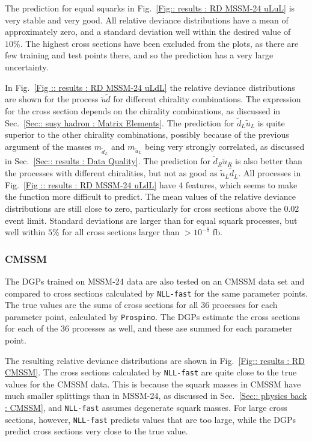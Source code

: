 \documentclass[twoside,english]{uiofysmaster}
\begin{document}
The prediction for equal squarks in Fig.~\ref{Fig:: results : RD MSSM-24 uLuL} is very stable and very good. All relative deviance distributions have a mean of approximately zero, and a standard deviation well within the desired value of $10 \%$. The highest cross sections have been excluded from the plots, as there are few training and test points there, and so the prediction has a very large uncertainty.

In Fig.~\ref{Fig :: results : RD MSSM-24 uLdL} the relative deviance distributions are shown for the process $\tilde{u} \tilde{d}$ for different chirality combinations. The expression for the cross section depends on the chirality combinations, as discussed in Sec.~\ref{Sec:: susy hadron : Matrix Elements}. The prediction for $\tilde{d}_L \tilde{u}_L$ is quite superior to the other chirality combinations, possibly because of the previous argument of the masses $m_{\tilde{d}_L}$ and $m_{\tilde{u}_L}$ being very strongly correlated, as discussed in Sec.~\ref{Sec:: results : Data Quality}. The prediction for $\tilde{d}_R \tilde{u}_R$ is also better than the processes with different chiralities, but not as good as $\tilde{u}_L\tilde{d}_L$. All processes in Fig.~\ref{Fig :: results : RD MSSM-24 uLdL} have 4 features, which seems to make the function more difficult to predict. The mean values of the relative deviance distributions are still close to zero, particularly for cross sections above the $0.02$ event limit. Standard deviations are larger than for equal squark processes, but well within $5\%$ for all cross sections larger than $> 10^{-8}$ fb.

\subsubsection{CMSSM}

The DGPs trained on MSSM-24 data are also tested on an CMSSM data set and compared to cross sections calculated by \verb|NLL-fast| for the same parameter points. The true values are the sums of cross sections for all 36 processes for each parameter point, calculated by \verb|Prospino|. The DGPs estimate the cross sections for each of the 36 processes as well, and these ase summed for each parameter point. 

The resulting relative deviance distributions are shown in Fig.~\ref{Fig:: results : RD CMSSM}. The cross sections calculated by \verb|NLL-fast| are quite close to the true values for the CMSSM data. This is because the squark masses in CMSSM have much smaller splittings than in MSSM-24, as discussed in Sec.~\ref{Sec:: physics back : CMSSM}, and \verb|NLL-fast| assumes degenerate squark masses. For large cross sections, however, \verb|NLL-fast| predicts values that are too large, while the DGPs predict cross sections very close to the true value.
\end{document}
